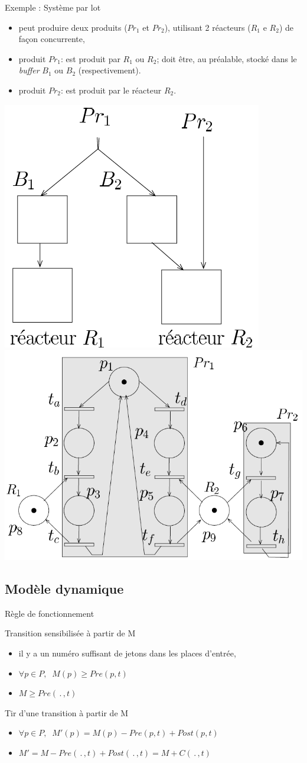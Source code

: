 \documentclass[compress]{beamer}
\begin{document}
\begin{frame}{Exemple : Système par lot}
\begin{itemize}
\item peut produire deux produits ($Pr_1$ et $Pr_2$), utilisant 2 réacteurs
($R_1$ e $R_2$) de fa\c{c}on concurrente,
\item produit $Pr_1$: est produit par $R_1$ ou $R_2$; doit être, au préalable,
stocké dans le {\it buffer} $B_1$ ou $B_2$ (respectivement).
\item produit $Pr_2$: est produit par le réacteur $R_2$.
\end{itemize}
\begin{center}
\includegraphics[width=.2\linewidth]{reacteur}
\hspace{.1\linewidth}
\includegraphics[width=.4\linewidth]{freator}
\end{center}
\end{frame}
 
\subsection{Modèle dynamique}
\begin{frame}{Règle de fonctionnement}
\begin{block}{Transition sensibilisée à partir de M}
	\begin{itemize}
	\item il y a un numéro suffisant de jetons dans les places d'entrée,
	\item $\forall p \in P, \;\;  M(p) \geq Pre(p, t)$
	\item $M \geq Pre(\, . \, ,t)$
	\end{itemize}
\end{block}
\begin{block}{Tir d'une transition à partir de M}
	\begin{itemize}
	\item $\forall p \in P, \;\; M'(p)=M(p)-Pre(p,t)+Post(p,t)$
	\item $M'=M-Pre(\, . \, ,t)+Post(\, . \, ,t)=M + C(\, . \, ,t)$
	\end{itemize}
\end{block}
\end{frame}
\end{document}
